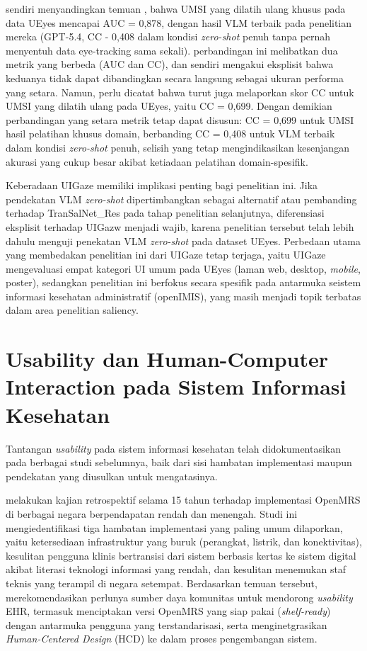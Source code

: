 \citet{song2026uigaze} sendiri menyandingkan temuan \citet{jiang2023ueyes}, bahwa UMSI yang dilatih ulang khusus pada data UEyes mencapai AUC = 0,878, dengan hasil VLM terbaik pada penelitian mereka (GPT-5.4, CC - 0,408 dalam kondisi \textit{zero-shot} penuh tanpa pernah menyentuh data eye-tracking sama sekali). perbandingan ini melibatkan dua metrik yang berbeda (AUC dan CC), dan \citet{song2026uigaze} sendiri mengakui eksplisit bahwa keduanya tidak dapat dibandingkan secara langsung sebagai ukuran performa yang setara. Namun, perlu dicatat bahwa \citet{jiang2023ueyes} turut juga melaporkan skor CC untuk UMSI yang dilatih ulang pada UEyes, yaitu CC = 0,699. Dengan demikian perbandingan yang setara metrik tetap dapat disusun: CC = 0,699 untuk UMSI hasil pelatihan khusus domain, berbanding CC = 0,408 untuk VLM terbaik dalam kondisi \textit{zero-shot} penuh, selisih yang tetap mengindikasikan kesenjangan akurasi yang cukup besar akibat ketiadaan pelatihan domain-spesifik.

Keberadaan UIGaze memiliki implikasi penting bagi penelitian ini. Jika pendekatan VLM \textit{zero-shot} dipertimbangkan sebagai alternatif atau pembanding terhadap TranSalNet\_Res pada tahap penelitian selanjutnya, diferensiasi eksplisit terhadap UIGazw menjadi wajib, karena penelitian tersebut telah lebih dahulu menguji penekatan VLM \textit{zero-shot} pada dataset UEyes. Perbedaan utama yang membedakan penelitian ini dari UIGaze tetap terjaga, yaitu UIGaze mengevaluasi empat kategori UI umum pada UEyes (laman web, desktop, \textit{mobile}, poster), sedangkan penelitian ini berfokus secara spesifik pada antarmuka seistem informasi kesehatan administratif (openIMIS), yang masih menjadi topik terbatas dalam area penelitian saliency. 

\section{Usability dan Human-Computer Interaction pada Sistem Informasi Kesehatan}

Tantangan \textit{usability} pada sistem informasi kesehatan telah didokumentasikan pada berbagai studi sebelumnya, baik dari sisi hambatan implementasi maupun pendekatan yang diusulkan untuk mengatasinya.

\citet{verma2021openmrs} melakukan kajian retrospektif selama 15 tahun terhadap implementasi OpenMRS di berbagai negara berpendapatan rendah dan menengah. Studi ini mengiedentifikasi tiga hambatan implementasi yang paling umum dilaporkan, yaitu ketersediaan infrastruktur yang buruk (perangkat, listrik, dan konektivitas), kesulitan pengguna klinis bertransisi dari sistem berbasis kertas ke sistem digital akibat literasi teknologi informasi yang rendah, dan kesulitan menemukan staf teknis yang terampil di negara setempat. Berdasarkan temuan tersebut, \citet{verma2021openmrs} merekomendasikan perlunya sumber daya komunitas untuk mendorong \textit{usability} EHR, termasuk menciptakan versi OpenMRS yang siap pakai (\textit{shelf-ready}) dengan antarmuka pengguna yang terstandarisasi, serta menginetgrasikan \textit{Human-Centered Design} (HCD) ke dalam proses pengembangan sistem.

